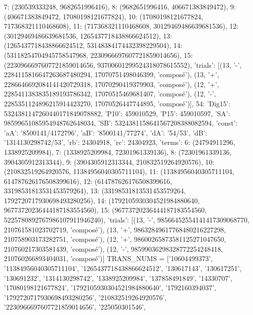 \documentclass[11pt,a4paper]{article}
\begin{document}
\begin{pycode}
{{{                7: (230539333248, 9682651996416),
                8: (9682651996416, 406671383849472),
                9: (406671383849472, 17080198121677824),
                10: (17080198121677824, 717368321110468608),
                11: (717368321110468608, 30129469486639681536),
                12: (30129469486639681536, 1265437718438866624512),
                13: (1265437718438866624512, 53148384174432398229504),
                14: (53118254704945758547968, 2230966697607721859014656),
                15: (2230966697607721859014656, 93700601299524318078615552)},
      'trials': [(13, '-', 2284115816647263687480294, 17070751498046399, 'composé'),
                 (13, '+', 2286646692084141420729318, 17070290419379903, 'composé'),
                 (12, '+', 2285411383835189193786342, 17070515469681407, 'composé'),
                 (12, '-', 2285351124896215914423270, 17070526447744895, 'composé')]},
 54: {'Dig15': 5324381147260440171849078882,
      'P10': 459010529,
      'P15': 459010597,
      'SA': 98599651085954948762648034,
      'SB': 5324381158641567208388082594,
      'const': {'aA': '8500141/4172796', 'aB': '8500141/77274', 'dA': '54/53', 'dB': '1314130298742/53'},
      'rb': 24304918,
      'rc': 24304923,
      'terms': {6: (24794911296, 1338925209984),
                7: (1338925209984, 72301961339136),
                8: (72301961339136, 3904305912313344),
                9: (3904305912313344, 210832519264920576),
                10: (210832519264920576, 11384956040305711104),
                11: (11384956040305711104, 614787626176508399616),
                12: (614787626176508399616, 33198531813531453579264),
                13: (33198531813531453579264, 1792720717930698493280256),
                14: (1792105930304521984880640, 96773720236444187183554560),
                15: (96773720236444187183554560, 5225780892767986107911946240)},
      'trials': [(13, '-', 98566452554141417309068770, 210761581023702719, 'composé'),
                 (13, '+', 98632849617768480216227298, 210758903173282751, 'composé'),
                 (12, '+', 98600265873581125271047650, 210760217303581439, 'composé'),
                 (12, '-', 98599036298328772254248418, 210760266893404031, 'composé')]}}
TRANS_NUMS = ['10604499373',
 '11384956040305711104',
 '1265437718438866624512',
 '130617143',
 '130617251',
 '130691232',
 '1314130298742',
 '1338925209984',
 '137858491849',
 '14330707',
 '17080198121677824',
 '1792105930304521984880640',
 '1792160394037',
 '1792720717930698493280256',
 '210832519264920576',
 '2230966697607721859014656',
 '225050301546',

\end{pycode}
\end{document}
